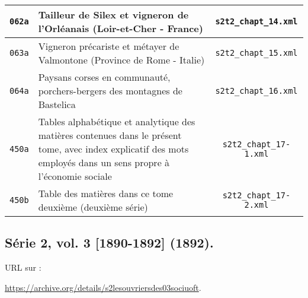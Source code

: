 \begin{center}
\begin{longtable}{ | c | p{9.5cm} | c | }
\texttt{062a} & Tailleur de Silex et vigneron de l'Orléanais (Loir-et-Cher - France) & \texttt{s2t2\_chapt\_14.xml} \\ \hline
\texttt{063a} & Vigneron précariste et métayer de Valmontone (Province de Rome - Italie) & \texttt{s2t2\_chapt\_15.xml} \\ \hline
\texttt{064a} & Paysans corses en communauté, porchers-bergers des montagnes de Bastelica & \texttt{s2t2\_chapt\_16.xml} \\ \hline
\texttt{450a} & Tables alphabétique et analytique des matières contenues dans le présent tome, avec index explicatif des mots employés dans un sens propre à l'économie sociale & \texttt{s2t2\_chapt\_17-1.xml} \\ \hline
\texttt{450b} & Table des matières dans ce tome deuxième (deuxième série) & \texttt{s2t2\_chapt\_17-2.xml} \\ \hline
\end{longtable}
\end{center}

\subsection{Série 2, vol. 3 [1890-1892] (1892).}
\label{mappings2t3}

URL sur \ia{} : 

\url{https://archive.org/details/s2lesouvriersdes03sociuoft}.

